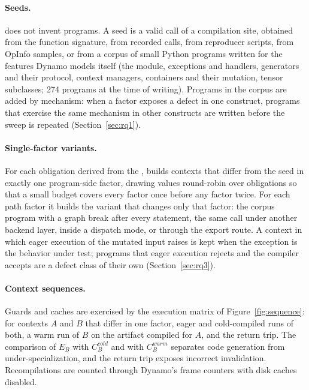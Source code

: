 \paragraph{Seeds.} \tool does not invent programs. A seed is a valid call of a compilation site, obtained from
the function signature, from recorded calls, from reproducer scripts, from OpInfo samples, or from a corpus of
small Python programs written for the features Dynamo models itself (the  module, exceptions and
handlers, generators and their protocol, context managers, containers and their mutation, tensor subclasses;
274 programs at the time of writing). Programs in the corpus are added by mechanism: when a factor exposes a
defect in one construct, programs that exercise the same mechanism in other constructs are written before the
sweep is repeated (Section~\ref{sec:rq1}).

\paragraph{Single-factor variants.} For each obligation derived from the \scs, \tool builds contexts that
differ from the seed in exactly one program-side factor, drawing values round-robin over obligations so that a
small budget covers every factor once before any factor twice. For each path factor it builds the variant that
changes only that factor: the corpus program with a graph break after every statement, the same call under
another backend layer, inside a dispatch mode, or through the export route. A context in which eager execution
of the mutated input raises is kept when the exception is the behavior under test; programs that eager
execution rejects and the compiler accepts are a defect class of their own (Section~\ref{sec:rq3}).



\paragraph{Context sequences.} Guards and caches are exercised by the execution matrix of
Figure~\ref{fig:sequence}: for contexts $A$ and $B$ that differ in one factor, eager and cold-compiled runs of
both, a warm run of $B$ on the artifact compiled for $A$, and the return trip. The comparison of $E_B$ with
$C_B^{\mathit{cold}}$ and with $C_B^{\mathit{warm}}$ separates code generation from under-specialization, and
the return trip exposes incorrect invalidation. Recompilations are counted through Dynamo's frame counters with
disk caches disabled.

